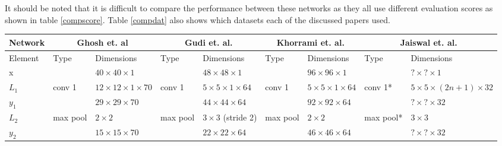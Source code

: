 It should be noted that it is difficult to compare the performance between these
networks as they all use different evaluation scores as shown in table \ref{compscore}. Table \ref{compdat} also shows
which datasets each of the discussed papers used.
\begin{landscape}
\begin{table}[h!]
{\footnotesize
\begin{tabular}{|lllllllll|}
\hline
Network                      & \multicolumn{2}{c}{Ghosh et. al\cite{Ghosh2015}}                         & \multicolumn{2}{c}{Gudi et. al.\cite{Gudi2015}}                            & \multicolumn{2}{c}{Khorrami et. al.\cite{dodeeplearn}}                          & \multicolumn{2}{c|}{Jaiswal et. al.\cite{Jaiswal2016}}   \\ \hline
\multicolumn{1}{|l|}{Element} & Type     & \multicolumn{1}{l|}{Dimensions}                    & Type     & \multicolumn{1}{l|}{Dimensions}                      & Type          & \multicolumn{1}{l|}{Dimensions}                  & Type      & Dimensions                     \\ \hline
\multicolumn{1}{|l|}{x}       &          & \multicolumn{1}{l|}{$40\times40\times1$}           &          & \multicolumn{1}{l|}{$48\times 48\times1$}            &               & \multicolumn{1}{l|}{$96\times96\times1$}         &           & $?\times?\times1$              \\ \hline
\multicolumn{1}{|l|}{$L_1$}   & conv 1   & \multicolumn{1}{l|}{$12\times 12\times1\times 70$} & conv 1   & \multicolumn{1}{l|}{$5\times 5\times1\times64$}      & conv 1        & \multicolumn{1}{l|}{$5\times5\times1\times64$}   & conv 1*   & $5\times5\times(2n+1)\times32$ \\
\multicolumn{1}{|l|}{$y_1$}   &          & \multicolumn{1}{l|}{$29\times29\times70$}          &          & \multicolumn{1}{l|}{$44\times44\times64$}            &               & \multicolumn{1}{l|}{$92\times92\times64$}        &           & $?\times?\times32$             \\ \hline
\multicolumn{1}{|l|}{$L_2$}   & max pool & \multicolumn{1}{l|}{$2\times 2$}                   & max pool & \multicolumn{1}{l|}{$3\times3$ (stride 2)}           & max pool      & \multicolumn{1}{l|}{$2\times2$}                  & max pool*  & $3\times3$                    \\
\multicolumn{1}{|l|}{$y_2$}   &          & \multicolumn{1}{l|}{$15\times15\times 70$}         &          & \multicolumn{1}{l|}{$22\times 22\times64$}           &               & \multicolumn{1}{l|}{$46\times46\times64$}        &           & $?\times?\times32$             \\ \hline

\end{tabular}}
\end{table}
\end{landscape}
